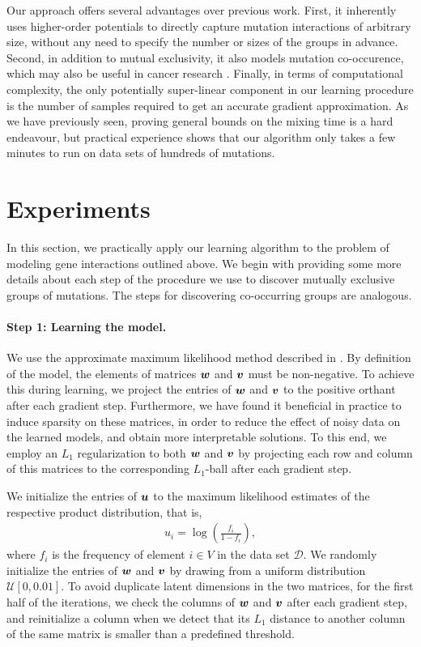 Our approach offers several advantages over previous work.
First, it inherently uses higher-order potentials to directly capture mutation interactions of arbitrary size, without any need to specify the number or sizes of the groups in advance.
Second, in addition to mutual exclusivity, it also models mutation co-occurence, which may also be useful in cancer research \citep{yeang08,raphael14}.
Finally, in terms of computational complexity, the only potentially super-linear component in our learning procedure is the number of samples required to get an accurate gradient approximation.
As we have previously seen, proving general bounds on the mixing time is a hard endeavour, but practical experience shows that our algorithm only takes a few minutes to run on data sets of hundreds of mutations.


\section{Experiments}
In this section, we practically apply our learning algorithm to the problem of modeling gene interactions outlined above.
We begin with providing some more details about each step of the procedure we use to discover mutually exclusive groups of mutations.
The steps for discovering co-occurring groups are analogous.

\paragraph{Step 1: Learning the \fldc{} model.}
We use the approximate maximum likelihood method described in .
By definition of the \fldc{} model, the elements of matrices $\bm{w}$ and $\bm{v}$ must be non-negative.
To achieve this during learning, we project the entries of $\bm{w}$ and $\bm{v}$ to the positive orthant after each gradient step.
Furthermore, we have found it beneficial in practice to induce sparsity on these matrices, in order to reduce the effect of noisy data on the learned models, and obtain more interpretable solutions.
To this end, we employ an $L_1$ regularization to both $\bm{w}$ and $\bm{v}$ by projecting each row and column of this matrices to the corresponding $L_1$-ball after each gradient step.

We initialize the entries of $\bm{u}$ to the maximum likelihood estimates of the respective product distribution, that is,
\begin{align*}
u_i = \log\left( \frac{f_i}{1 - f_i} \right),
\end{align*}
where $f_i$ is the frequency of element $i \in V$ in the data set $\mathcal{D}$.
We randomly initialize the entries of $\bm{w}$ and $\bm{v}$ by drawing from a uniform distribution $\mathcal{U}[0, 0.01]$.
To avoid duplicate latent dimensions in the two matrices, for the first half of the iterations, we check the columns of $\bm{w}$ and $\bm{v}$ after each gradient step, and reinitialize a column when we detect that its $L_1$ distance to another column of the same matrix is smaller than a predefined threshold.

